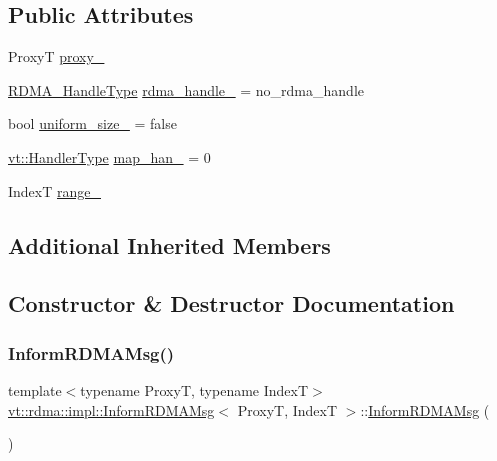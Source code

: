 \subsection*{Public Attributes}
\begin{DoxyCompactItemize}
\item 
ProxyT \hyperlink{structvt_1_1rdma_1_1impl_1_1_inform_r_d_m_a_msg_ac35c5f3c29239a2bb89f366602416a77}{proxy\+\_\+}
\item 
\hyperlink{namespacevt_a10442579ec4e7ebef223818e64bcf908}{R\+D\+M\+A\+\_\+\+Handle\+Type} \hyperlink{structvt_1_1rdma_1_1impl_1_1_inform_r_d_m_a_msg_a0f87b0ef4707c5784b166e464b466681}{rdma\+\_\+handle\+\_\+} = no\+\_\+rdma\+\_\+handle
\item 
bool \hyperlink{structvt_1_1rdma_1_1impl_1_1_inform_r_d_m_a_msg_a863c6d2d07d1cd4dc8ff73e4a3f052c2}{uniform\+\_\+size\+\_\+} = false
\item 
\hyperlink{namespacevt_af64846b57dfcaf104da3ef6967917573}{vt\+::\+Handler\+Type} \hyperlink{structvt_1_1rdma_1_1impl_1_1_inform_r_d_m_a_msg_aba52b95e5d133121d335c90b0b6101e1}{map\+\_\+han\+\_\+} = 0
\item 
IndexT \hyperlink{structvt_1_1rdma_1_1impl_1_1_inform_r_d_m_a_msg_a02ed7f7329f9df6a6655702029ad534a}{range\+\_\+}
\end{DoxyCompactItemize}
\subsection*{Additional Inherited Members}


\subsection{Constructor \& Destructor Documentation}
\mbox{\label{structvt_1_1rdma_1_1impl_1_1_inform_r_d_m_a_msg_a551aa10ed9bed0f5c719875462de7ea5}} 
\subsubsection{\texorpdfstring{Inform\+R\+D\+M\+A\+Msg()}{InformRDMAMsg()}\hspace{0.1cm}{\footnotesize\ttfamily [1/2]}}
{\footnotesize\ttfamily template$<$typename ProxyT, typename IndexT$>$ \\
\hyperlink{structvt_1_1rdma_1_1impl_1_1_inform_r_d_m_a_msg}{vt\+::rdma\+::impl\+::\+Inform\+R\+D\+M\+A\+Msg}$<$ ProxyT, IndexT $>$\+::\hyperlink{structvt_1_1rdma_1_1impl_1_1_inform_r_d_m_a_msg}{Inform\+R\+D\+M\+A\+Msg} (\begin{DoxyParamCaption}{ }\end{DoxyParamCaption})\hspace{0.3cm}{\ttfamily [default]}}

